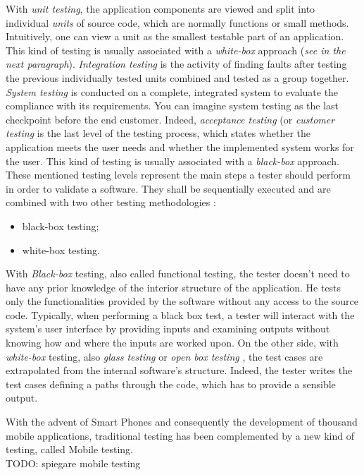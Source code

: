 With \textit{unit testing}, the application components are viewed and split into  individual \textit{units} of source code, which are normally functions or small methods. Intuitively, one can view a unit as the smallest testable part of an application. This kind of testing is usually associated with a \textit{white-box} approach (\textit{see in the next paragraph}).  \textit{Integration testing} is the activity of finding faults after testing the previous individually tested units combined and tested as a group together. \textit{System testing} is conducted on a complete, integrated system to evaluate the compliance with its requirements. You can imagine system testing as the last checkpoint before the end customer. Indeed, \textit{acceptance testing} (or \textit{customer testing} is the last level of the testing process, which states whether the application meets the user needs and whether the implemented system works for the user. This kind of testing is usually associated with a \textit{black-box} approach. 
\\
These mentioned testing levels represent the main steps a tester should perform in order to validate a software. They shall be sequentially executed and are combined with two other testing methodologies \cite{white-box, black-box}: 
\begin{itemize}
\item black-box testing;
\item white-box testing.
\end{itemize} 
With \textit{Black-box} testing, also called functional testing, the tester doesn't need to have any prior knowledge of the interior structure of the application. He tests only the functionalities provided by the software without any access to the source code. Typically, when performing a black box test, a tester will interact with the system's user interface by providing inputs and examining outputs without knowing how and where the inputs are worked upon. On the other side, with \textit{white-box} testing, also \textit{glass testing} or \textit{open box testing} \cite{grano}, the test cases are extrapolated from the internal software's structure. Indeed, the tester writes the test cases defining a paths through the code, which has to provide a sensible output.

With the advent of Smart Phones and consequently the development of thousand  mobile applications, traditional testing has been complemented by a new kind of testing, called Mobile testing. \\
TODO: spiegare mobile testing 





